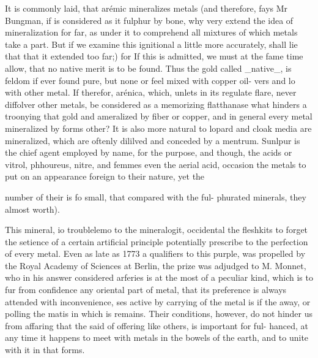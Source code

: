 \documentclass{article}
\begin{document}
It is commonly laid, that arémic mineralizes metals (and therefore, fays Mr Bungman, if is considered as it fulphur by bone, why very extend the idea of mineralization for far, as under it to comprehend all mixtures of which metals take a part. But if we examine this ignitional a little more accurately, shall lie that that it extended too far;) for If this is admitted, we must at the fame time allow, that no native merit is to be found. Thus the gold called \_native\_, is feldom if ever found pure, but none or feel mixed with copper oil- vers and lo with other metal. If therefor, arénica, which, unlets in its regulate flare, never diffolver other metals, be considered as a memorizing flatthanase what hinders a troonying that gold and ameralized by fiber or copper, and in general every metal mineralized by forms other? It is also more natural to lopard and cloak media are mineralized, which are oftenly dililved and conceded by a mentrum. Sunlpur is the chief agent employed by name, for the purpose, and though, the acids or vitrol, phhoureus, nitre, and femmes even the aerial acid, occasion the metals to put on an appearance foreign to their nature, yet the

number of their is fo small, that compared with the ful- phurated minerals, they almost worth).

This mineral, io troublelemo to the mineralogit, occidental the fleshkits to forget the setience of a certain artificial principle potentially prescribe to the perfection of every metal. Even as late as 1773 a qualifiers to this purple, was propelled by the Royal Academy of Sciences at Berlin, the prize was adjudged to M. Monnet, who in his answer considered arferies is at the most of a peculiar kind, which is to fur from confidence any oriental part of metal, that its preference is always attended with inconvenience, ses active by carrying of the metal is if the away, or polling the matis in which is remains. Their conditions, however, do not hinder us from affaring that the said of offering like others, is important for ful- hanced, at any time it happens to meet with metals in the bowels of the earth, and to unite with it in that forms.
\end{document}
